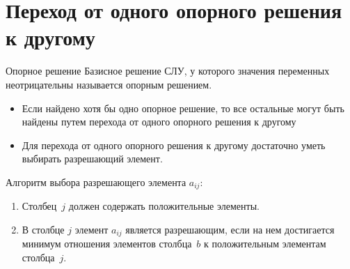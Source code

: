 \documentclass[unicode,11pt,notheorems]{beamer}
\begin{document}
\section{Переход от одного опорного решения к другому}
\begin{frame}{Опорное решение}
Базисное решение СЛУ, у которого значения переменных неотрицательны называется \alert{опорным решением}.

\begin{itemize}
\item 
	Если найдено хотя бы одно опорное решение, то все остальные могут быть найдены путем перехода от одного опорного решения к другому
\item 
	Для перехода от одного опорного решения к другому достаточно уметь выбирать разрешающий элемент.
\end{itemize}


\begin{block}{Алгоритм выбора разрешающего элемента $a_{ij}$:}
\begin{enumerate}
\item  
	Столбец~$j$ должен содержать положительные элементы.
\item  
	В столбце $j$ элемент $a_{ij}$ является разрешающим, если на нем достигается минимум отношения элементов столбца~$b$ к положительным элементам столбца~$j$.
\end{enumerate}
\end{block}
\end{frame}
\end{document}
